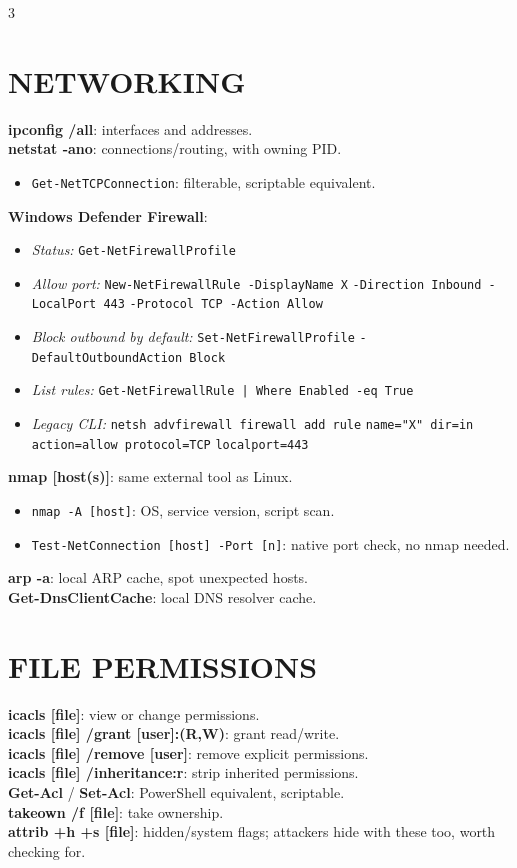 \documentclass[7pt,landscape]{article}
\begin{document}
\begin{multicols*}{3}
\section{NETWORKING}
\textbf{ipconfig /all}: interfaces and addresses. \\
\textbf{netstat -ano}: connections/routing, with owning PID.
\begin{itemize}
    \item \texttt{Get-NetTCPConnection}: filterable, scriptable equivalent.
\end{itemize}
\textbf{Windows Defender Firewall}:
\begin{itemize}
    \item \textit{Status:} \texttt{Get-NetFirewallProfile}
    \item \textit{Allow port:} \texttt{New-NetFirewallRule -DisplayName X} \newline \texttt{-Direction Inbound -LocalPort 443} \newline \texttt{-Protocol TCP -Action Allow}
    \item \textit{Block outbound by default:} \newline \texttt{Set-NetFirewallProfile} \newline \texttt{-DefaultOutboundAction Block}
    \item \textit{List rules:} \texttt{Get-NetFirewallRule | Where Enabled -eq True}
    \item \textit{Legacy CLI:} \texttt{netsh advfirewall firewall add rule} \newline \texttt{name="X" dir=in action=allow protocol=TCP} \newline \texttt{localport=443}
\end{itemize}
\textbf{nmap [host(s)]}: same external tool as \textcolor{linuxc}{Linux}.
\begin{itemize}
    \item \texttt{nmap -A [host]}: OS, service version, script scan.
    \item \texttt{Test-NetConnection [host] -Port [n]}: native port check, no nmap needed.
\end{itemize}
\textbf{arp -a}: local ARP cache, spot unexpected hosts. \\
\textbf{Get-DnsClientCache}: local DNS resolver cache.

\section{FILE PERMISSIONS}
\textbf{icacls [file]}: view or change permissions. \\
\textbf{icacls [file] /grant [user]:(R,W)}: grant read/write. \\
\textbf{icacls [file] /remove [user]}: remove explicit permissions. \\
\textbf{icacls [file] /inheritance:r}: strip inherited permissions. \\
\textbf{Get-Acl} / \textbf{Set-Acl}: PowerShell equivalent, scriptable. \\
\textbf{takeown /f [file]}: take ownership. \\
\textbf{attrib +h +s [file]}: hidden/system flags; attackers hide with these too, worth checking for.


\end{multicols*}
\end{document}

